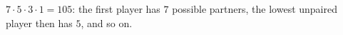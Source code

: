 $7\cdot5\cdot3\cdot1=\boxed{105}$: the first player has $7$ possible partners, the lowest unpaired player then has $5$, and so on.
